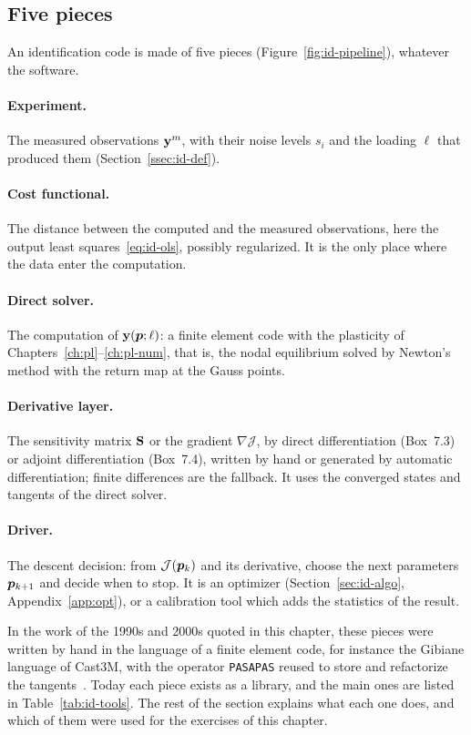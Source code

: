 \subsection{Five pieces}
An identification code is made of five pieces (Figure~\ref{fig:id-pipeline}),
whatever the software.

\paragraph{Experiment.} The measured observations $\mathbf{y}^m$, with their noise
levels $s_i$ and the loading $\ell$ that produced them (Section~\ref{ssec:id-def}).

\paragraph{Cost functional.} The distance between the computed and the measured
observations, here the output least squares~\eqref{eq:id-ols}, possibly
regularized. It is the only place where the data enter the computation.

\paragraph{Direct solver.} The computation of $\mathbf{y}(\bm{p};\ell)$: a finite element
code with the plasticity of Chapters~\ref{ch:pl}--\ref{ch:pl-num}, that is, the
nodal equilibrium solved by Newton's method with the return map at the Gauss
points.

\paragraph{Derivative layer.} The sensitivity matrix $\mathbf{S}$ or the gradient
$\nabla\mathcal J$, by direct differentiation (Box~7.3) or adjoint differentiation
(Box~7.4), written by hand or generated by automatic differentiation; finite
differences are the fallback. It uses the converged states and tangents of the
direct solver.

\paragraph{Driver.} The descent decision: from $\mathcal J(\bm{p}_k)$ and its derivative,
choose the next parameters $\bm{p}_{k+1}$ and decide when to stop. It is an optimizer
(Section~\ref{sec:id-algo}, Appendix~\ref{app:opt}), or a calibration tool which
adds the statistics of the result.

In the work of the 1990s and 2000s quoted in this chapter, these pieces were
written by hand in the language of a finite element code, for instance the
Gibiane language of Cast3M, with the operator \texttt{PASAPAS} reused to store
and refactorize the tangents~\cite{LecampionConstantinescuNguyen2002,ConstantinescuTardieu2001b}.
Today each piece exists as a library, and the main ones are listed in
Table~\ref{tab:id-tools}. The rest of the section explains what each one does,
and which of them were used for the exercises of this chapter.

